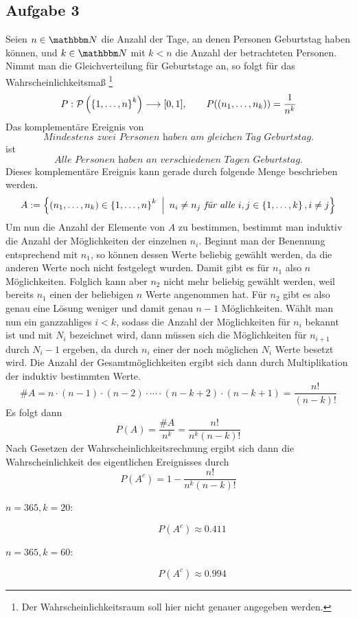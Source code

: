 \subsection*{Aufgabe 3} %
\label{sub:aufgabe_3}

	Seien $n\in\SN$ die Anzahl der Tage, an denen Personen Geburtstag haben können, und $k\in\SN$ mit $k<n$ die Anzahl der betrachteten Personen.
	Nimmt man die Gleichverteilung für Geburtstage an, so folgt für das Wahrscheinlichkeitsmaß
	\footnote{Der Wahrscheinlichkeitsraum soll hier nicht genauer angegeben werden.}
	\[ P:\mathcal{P}\left(  \left\{ 1,\ldots,n \right\}^k  \right)\longrightarrow [0,1] ,\qquad P((n_1,\ldots,n_k)) = \frac{1}{n^k} \]
	Das komplementäre Ereignis von 
	\[ \textit{Mindestens zwei Personen haben am gleichen Tag Geburtstag.} \]
	ist
	\[ \textit{Alle Personen haben an verschiedenen Tagen Geburtstag.} \]
	Dieses komplementäre Ereignis kann gerade durch folgende Menge beschrieben werden.
	$$ A:=\left\{  (n_1,\ldots,n_k)\in\left\{ 1,\ldots,n \right\}^k  \enspace \middle\vert \enspace  n_i \neq n_j \textit{ für alle } i,j\in\left\{ 1,\ldots,k \right\},i\neq j  \right\} $$
	Um nun die Anzahl der Elemente von $A$ zu bestimmen, bestimmt man induktiv die Anzahl der Möglichkeiten der einzelnen $n_i$.
	Beginnt man der Benennung entsprechend mit $n_1$, so können dessen Werte beliebig gewählt werden, da die anderen Werte noch nicht festgelegt wurden.
	Damit gibt es für $n_1$ also $n$ Möglichkeiten.
	Folglich kann aber $n_2$ nicht mehr beliebig gewählt werden, weil bereits $n_1$ einen der beliebigen $n$ Werte angenommen hat.
	Für $n_2$ gibt es also genau eine Lösung weniger und damit genau $n-1$ Möglichkeiten.
	Wählt man nun ein ganzzahliges $i<k$, sodass die Anzahl der Möglichkeiten für $n_i$ bekannt ist und mit $N_i$ bezeichnet wird, dann müssen sich die Möglichkeiten für $n_{i+1}$ durch $N_i -1$ ergeben, da durch $n_i$ einer der noch möglichen $N_i$ Werte besetzt wird.
	Die Anzahl der Gesamtmöglichkeiten ergibt sich dann durch Multiplikation der induktiv bestimmten Werte.
	$$ \#A = n\cdot(n-1)\cdot(n-2)\cdot\cdots\cdot(n-k+2)\cdot(n-k+1) = \frac{n!}{(n-k)!} $$
	Es folgt dann
	$$ P(A) = \frac{\#A}{n^k} = \frac{n!}{n^k(n-k)!} $$
	Nach Gesetzen der Wahrscheinlichkeitsrechnung  ergibt sich dann die Wahrscheinlichkeit des eigentlichen Ereignisses durch
	$$ \boxed{P(A^c) = 1- \frac{n!}{n^k(n-k)!}} $$
	\begin{description}
		\item[$n=365,k=20$:]
			$$ P(A^c) \approx 0.411 $$
		\item[$n=365,k=60$:]
			$$ P(A^c) \approx 0.994 $$ 
	\end{description}


